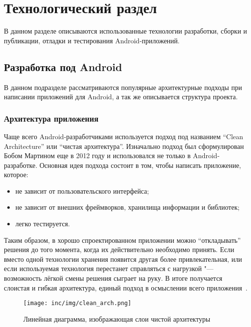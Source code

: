 \chapter{Технологический раздел}
\label{ch:tech}
В данном разделе описываются использованные технологии разработки, сборки и публикации, отладки и тестирования Android-приложений.

\section{Разработка под Android}
\label{sec:dev}
В данном подразделе рассматриваются популярные архитектурные подходы при написании приложений для Android, а так же описывается структура проекта.

\subsection{Архитектура приложения}
\label{subsec:arch}

Чаще всего Android-разработчиками используется подход под названием ``Clean Architecture'' или ``чистая архитектура''.
Изначально подход был сформулирован Бобом Мартином еще в 2012 году\cite{martin:clean} и использовался не только в Android-разработке.
Основная идея подхода состоит в том, чтобы написать приложение, которое:
\begin{itemize}
  \item не зависит от пользовательского интерфейса;
  \item не зависит от внешних фреймворков, хранилища информации и библиотек;
  \item легко тестируется.
\end{itemize}

Таким образом, в хорошо спроектированном приложении можно ``откладывать'' решения до того момента, когда их действительно необходимо принять.
Если вместо одной технологии хранения появится другая более привлекательная, или если используемая технология перестанет справляться с нагрузкой "--- возможность лёгкой смены решения сыграет на руку.
В итоге получается слоистая и гибкая архитектура, единый подход в осмыслении всего приложения~\cite{gihub:androidArch}.

\begin{figure}[ht]
  \centering
  \texttt{[image: inc/img/clean\_arch.png]}
  \caption{Линейная диаграмма, изображающая слои чистой архитектуры}
  \label{fig:cleanArch}
\end{figure}

